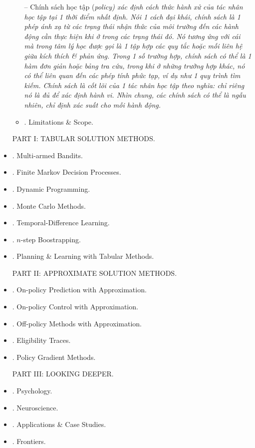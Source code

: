 \documentclass{article}
\begin{document}
\begin{itemize}
\begin{itemize}
        -- Chính sách học tập (\it policy) xác định cách thức hành xử của tác nhân học tập tại 1 thời điểm nhất định. Nói 1 cách đại khái, chính sách là 1 phép ánh xạ từ các trạng thái nhận thức của môi trường đến các hành động cần thực hiện khi ở trong các trạng thái đó. Nó tương ứng với cái mà trong tâm lý học được gọi là 1 tập hợp các quy tắc hoặc mối liên hệ giữa kích thích \& phản ứng. Trong 1 số trường hợp, chính sách có thể là 1 hàm đơn giản hoặc bảng tra cứu, trong khi ở những trường hợp khác, nó có thể liên quan đến các phép tính phức tạp, ví dụ như 1 quy trình tìm kiếm. Chính sách là cốt lõi của 1 tác nhân học tập theo nghĩa: chỉ riêng nó là đủ để xác định hành vi. Nhìn chung, các chính sách có thể là ngẫu nhiên, chỉ định xác suất cho mỗi hành động.
        \item {. Limitations \& Scope.}
    \end{itemize}

    PART I: TABULAR SOLUTION METHODS.
    \item {. Multi-armed Bandits.}
    \item {. Finite Markov Decision Processes.}
    \item {. Dynamic Programming.}
    \item {. Monte Carlo Methods.}
    \item {. Temporal-Difference Learning.}
    \item {. $n$-step Boostrapping.}
    \item {. Planning \& Learning with Tabular Methods.}

    PART II: APPROXIMATE SOLUTION METHODS.
    \item {. On-policy Prediction with Approximation.}
    \item {. On-policy Control with Approximation.}
    \item {. Off-policy Methods with Approximation.}
    \item {. Eligibility Traces.}
    \item {. Policy Gradient Methods.}

    PART III: LOOKING DEEPER.
    \item {. Psychology.}
    \item {. Neuroscience.}
    \item {. Applications \& Case Studies.}
    \item {. Frontiers.}
\end{itemize}
\end{document}
